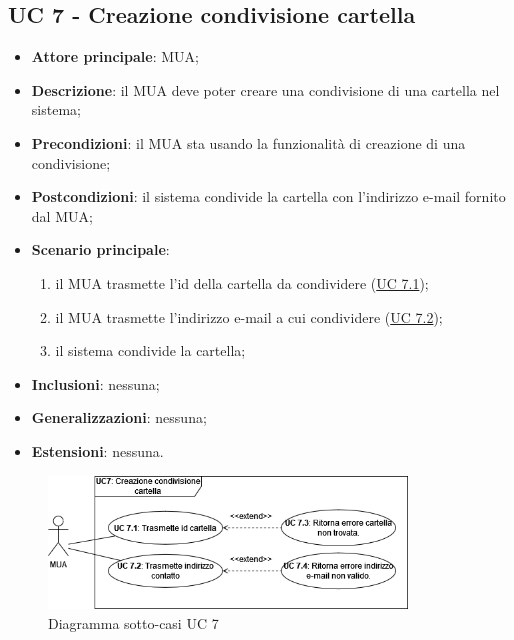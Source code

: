 \subsection{UC 7 - Creazione condivisione cartella} \label{sec:UC7}

    \begin{itemize}
        \item \textbf{Attore principale}: MUA;
        \item \textbf{Descrizione}: il MUA deve poter creare una condivisione di una cartella nel sistema;
        \item \textbf{Precondizioni}: il MUA sta usando la funzionalità di creazione di una condivisione;
        \item \textbf{Postcondizioni}: il sistema condivide la cartella con l'indirizzo e-mail fornito dal MUA;
        \item \textbf{Scenario principale}:
            \begin{enumerate}
                \item il MUA trasmette l'id della cartella da condividere (\hyperref[sec:UC7.1]{UC 7.1});
                \item il MUA trasmette l'indirizzo e-mail a cui condividere (\hyperref[sec:UC7.2]{UC 7.2});
                \item il sistema condivide la cartella;
            \end{enumerate}
        \item \textbf{Inclusioni}: nessuna;
        \item \textbf{Generalizzazioni}: nessuna;
        \item \textbf{Estensioni}: nessuna.
    \end{itemize}

    \begin{figure}[H]
        \includegraphics[width=0.85\textwidth]{sections/uc_imgs/UC07.png}
        \centering
        \caption{Diagramma sotto-casi UC 7}
    \end{figure}

